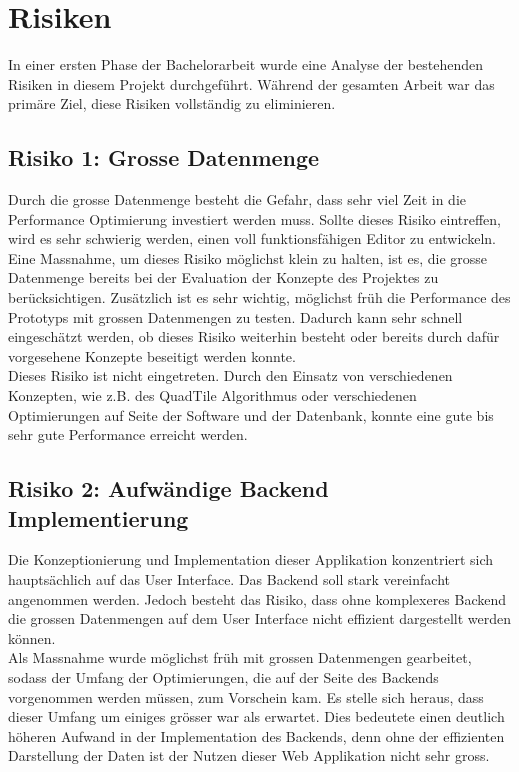 \section{Risiken}
In einer ersten Phase der Bachelorarbeit wurde eine Analyse der bestehenden Risiken in diesem Projekt durchgeführt. Während der gesamten Arbeit war das primäre Ziel, diese Risiken vollständig zu eliminieren.
\subsection*{Risiko 1: Grosse Datenmenge}
Durch die grosse Datenmenge besteht die Gefahr, dass sehr viel Zeit in die Performance Optimierung investiert werden muss. Sollte dieses Risiko eintreffen, wird es sehr schwierig werden, einen voll funktionsfähigen Editor zu entwickeln.\\
Eine Massnahme, um dieses Risiko möglichst klein zu halten, ist es, die grosse Datenmenge bereits bei der Evaluation der Konzepte des Projektes zu berücksichtigen. Zusätzlich ist es sehr wichtig, möglichst früh die Performance des Prototyps mit grossen Datenmengen zu testen. Dadurch kann sehr schnell eingeschätzt werden, ob dieses Risiko weiterhin besteht oder bereits durch dafür vorgesehene Konzepte beseitigt werden konnte.\\
Dieses Risiko ist nicht eingetreten. Durch den Einsatz von verschiedenen Konzepten, wie z.B. des QuadTile Algorithmus \cite{OSMQuadTiles} oder verschiedenen Optimierungen auf Seite der Software und der Datenbank, konnte eine gute bis sehr gute Performance erreicht werden.
\subsection*{Risiko 2: Aufwändige Backend Implementierung}
Die Konzeptionierung und Implementation dieser Applikation konzentriert sich hauptsächlich auf das User Interface. Das Backend soll stark vereinfacht angenommen werden. Jedoch besteht das Risiko, dass ohne komplexeres Backend die grossen Datenmengen auf dem User Interface nicht effizient dargestellt werden können.\\
Als Massnahme wurde möglichst früh mit grossen Datenmengen gearbeitet, sodass der Umfang der Optimierungen, die auf der Seite des Backends vorgenommen werden müssen, zum Vorschein kam. Es stelle sich heraus, dass dieser Umfang  um einiges grösser war als erwartet. Dies bedeutete einen deutlich höheren Aufwand in der Implementation des Backends, denn ohne der effizienten Darstellung der Daten ist der Nutzen dieser Web Applikation nicht sehr gross.
